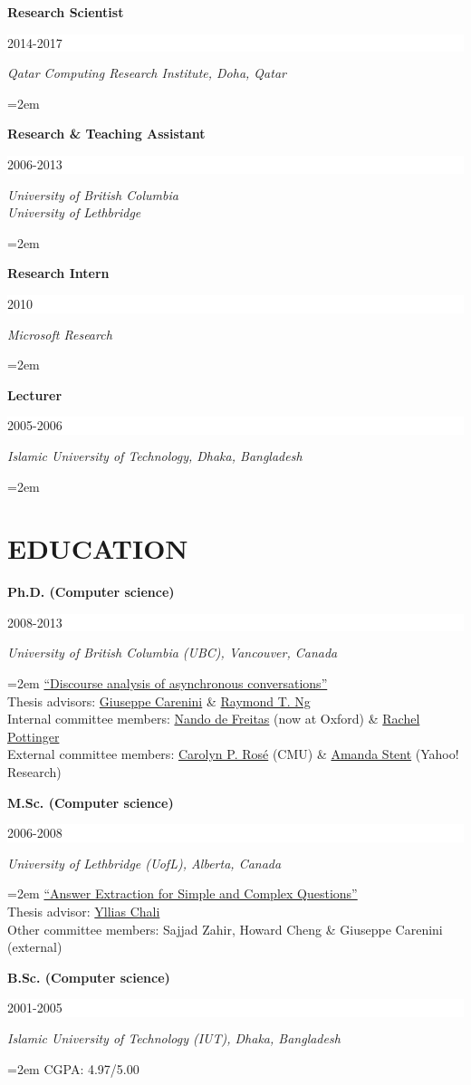\documentclass[paper=letter,fontsize=11pt]{scrartcl} %
\newcommand{\sepspace}{\vspace*{1em}}		%
\newcommand{\NewPart}[2]{\section*{\uppercase{#1} #2}}
\newcommand{\EducationEntry}[4]{
		\noindent \textbf{#1} \hfill      %
		\colorbox{White}{%
			\parbox{6em}{%
			\hfill\color{Black}#2}} \par  %
		\noindent \textit{#3} \par        %
		\noindent\hangindent=2em\hangafter=0 \small #4 %
		\normalsize \par}
\newcommand{\ExpEntry}[3]{
		\noindent \textbf{#1}       %
			\textit{#2} \hfill
			\colorbox{White}{%
			\parbox{10em}{%
			\hfill\color{Black}#3}} \par} %
\begin{document}
\EducationEntry{Research Scientist}{2014-2017}{Qatar Computing Research Institute, Doha, Qatar}{}
\EducationEntry{Research \& Teaching Assistant}{2006-2013}{University of British Columbia \\ University of Lethbridge}{}
\EducationEntry{Research Intern}{2010}{Microsoft Research}{}
\EducationEntry{Lecturer}{2005-2006}{Islamic University of Technology, Dhaka, Bangladesh}{}%


\NewPart{Education}{}

\EducationEntry{Ph.D. (Computer science)}{2008-2013}{University of British Columbia (UBC), Vancouver, Canada}{\href{https://open.library.ubc.ca/cIRcle/collections/ubctheses/24/items/1.0165726}{``Discourse analysis of asynchronous conversations''}\\
{Thesis advisors: \href{https://www.cs.ubc.ca/~carenini/}{Giuseppe Carenini} \& \href{https://www.cs.ubc.ca/~rng/}{Raymond T. Ng}}\\
{Internal committee members: \href{https://www.cs.ox.ac.uk/people/nando.defreitas/} {Nando de Freitas} (now at Oxford) \& \href{http://www.cs.ubc.ca/~rap/} {Rachel Pottinger}}\\ 
{External committee members: \href{http://www.cs.cmu.edu/~cprose/}{Carolyn P. Rosé} (CMU) \& \href {http://amandastent.com/}{Amanda Stent} (Yahoo! Research)}
}
\sepspace
\EducationEntry{M.Sc. (Computer science)}{2006-2008}{University of Lethbridge (UofL), Alberta, Canada}
{\href{https://www.uleth.ca/dspace/handle/10133/666}
{``Answer Extraction for Simple and Complex Questions''}\\
  {Thesis advisor: \href{http://www.cs.uleth.ca/~chali/}{Yllias Chali}}\\
{Other committee members: Sajjad Zahir, Howard Cheng \& Giuseppe Carenini (external)}
}
\sepspace
\EducationEntry{B.Sc. (Computer science)}{2001-2005}{Islamic University of Technology (IUT), Dhaka, Bangladesh}
{CGPA: 4.97/5.00}
\sepspace
\end{document}
